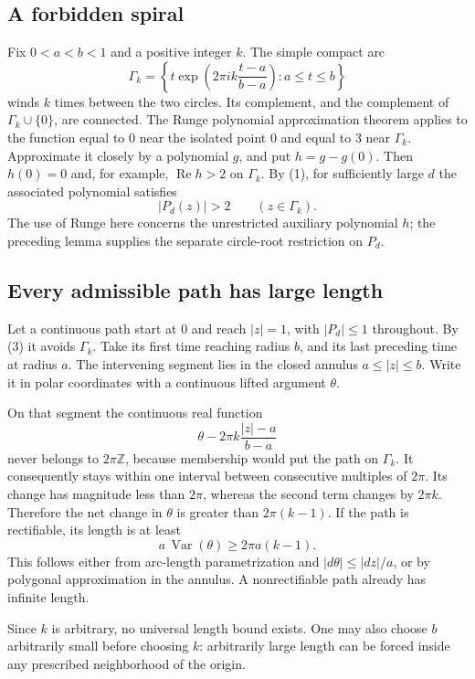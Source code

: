 \subsection*{A forbidden spiral}
Fix $0<a<b<1$ and a positive integer $k$. The simple compact arc
\[
 \Gamma_k=\left\{t\exp\left(2\pi i k\frac{t-a}{b-a}\right):
                      a\le t\le b\right\}
\]
winds $k$ times between the two circles. Its complement, and the complement of $\Gamma_k\cup\{0\}$, are connected.
The Runge polynomial approximation theorem applies to the function equal to $0$ near the isolated point $0$ and equal to $3$ near $\Gamma_k$. Approximate it closely by a polynomial $g$, and put $h=g-g(0)$. Then $h(0)=0$ and, for example,
$\operatorname{Re}h>2$ on $\Gamma_k$.
By (1), for sufficiently large $d$ the associated polynomial satisfies
\[
 |P_d(z)|>2\qquad(z\in\Gamma_k).
 \tag{3}
\]
The use of Runge here concerns the unrestricted auxiliary polynomial $h$; the preceding lemma supplies the separate circle-root restriction on $P_d$.

\subsection*{Every admissible path has large length}
Let a continuous path start at $0$ and reach $|z|=1$, with $|P_d|\le1$ throughout. By (3) it avoids $\Gamma_k$. Take its first time reaching radius $b$, and its last preceding time at radius $a$. The intervening segment lies in the closed annulus $a\le|z|\le b$. Write it in polar coordinates with a continuous lifted argument $\theta$.

On that segment the continuous real function
\[
 \theta-2\pi k\frac{|z|-a}{b-a}
\]
never belongs to $2\pi\mathbb Z$, because membership would put the path on $\Gamma_k$. It consequently stays within one interval between consecutive multiples of $2\pi$. Its change has magnitude less than $2\pi$, whereas the second term changes by $2\pi k$. Therefore the net change in $\theta$ is greater than $2\pi(k-1)$.
If the path is rectifiable, its length is at least
\[
 a\,\operatorname{Var}(\theta)\ge2\pi a(k-1).
\]
This follows either from arc-length parametrization and $|d\theta|\le|dz|/a$, or by polygonal approximation in the annulus. A nonrectifiable path already has infinite length.

Since $k$ is arbitrary, no universal length bound exists. One may also choose $b$ arbitrarily small before choosing $k$: arbitrarily large length can be forced inside any prescribed neighborhood of the origin.

